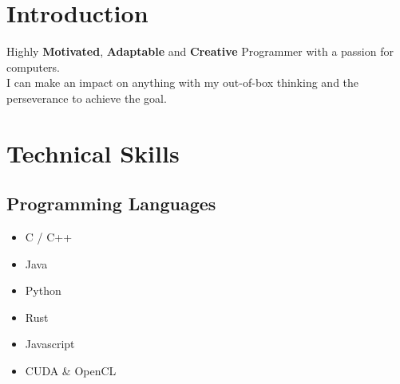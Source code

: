 \documentclass{article}
\date{}
\begin{document}
\title{\LARGE}
\author{\LARGE \textbf{Jagadeesh \textcolor{violet}{Kotra}} }
\maketitle

\section{Introduction}

Highly \textbf{Motivated}, \textbf{Adaptable} and \textbf{Creative} Programmer with a passion for computers.\\

I can make an impact on anything with my out-of-box thinking and the perseverance to achieve the goal.

\section{Technical Skills}
\subsection{Programming Languages}
\begin{multicols}{3}
    \begin{itemize}
        \item C / C++
        \item Java
        \item Python
        \item Rust
        \item Javascript
        \item CUDA \& OpenCL
    \end{itemize}
\end{multicols}
\end{document}
